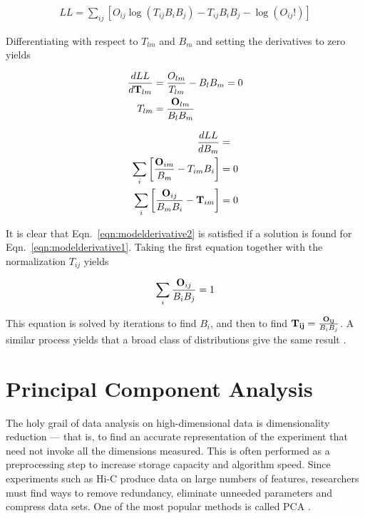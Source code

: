 \begin{align}
  \label{eqn:llmodel}
  LL = \sum_{ij}\left[O_{ij}\log{(T_{ij}B_{i}B_{j})} - T_{ij}B_{i}B_{j} - \log{(O_{ij}!)}\right]
\end{align}

Differentiating with respect to $T_{lm}$ and $B_m$ and setting the derivatives to zero yields

\begin{align}
  \label{eqn:modelderivative1}
  \frac{dLL}{d\mathbf{T}_{lm}} &= \frac{O_{lm}}{T_{lm}} - B_{l}B_{m} = 0 \\
  T_{lm} &= \frac{\mathbf{O}_{lm}}{B_{l}B_{m}}
\end{align}

\begin{align}
  \label{eqn:modelderivative2}
  \frac{dLL}{dB_{m}} &= \\
  \sum_i\left[\frac{\mathbf{O}_{im}}{B_m} - T_{im}B_i\right] &= 0 \\
  \sum_i\left[\frac{\mathbf{O}_{ij}}{B_{m}B_{i}} - \mathbf{T}_{im}\right] &= 0
\end{align}

It is clear that Eqn.~\eqref{eqn:modelderivative2} is satisfied if a solution is found for Eqn.~\eqref{eqn:modelderivative1}.  Taking the first equation together  with the
normalization $T_{ij}$ yields

\begin{align}
  \label{eqn:result}
  \sum_i \frac{\mathbf{O}_{ij}}{B_{i}B_{j}} = 1
\end{align}

This equation is solved by iterations to find $B_i$, and then to find $\mathbf{T_{ij}} = \frac{\mathbf{O_{ij}}}{B_{i}B_j}$.  A similar process yields that a broad class of
distributions give the same result \citep{imakaev2012}.

\section*{Principal Component Analysis}

The holy grail of data analysis on high-dimensional data is dimensionality reduction --- that is, to find an accurate representation of
the experiment that need not invoke all the dimensions measured.  This is often performed as a preprocessing step to increase storage capacity
and algorithm speed.  Since experiments such as Hi-C produce data on large numbers of features, researchers must find ways to remove redundancy,
eliminate unneeded parameters and compress data sets.  One of the most popular methods is called \gls{PCA} \citep{law1987}.

